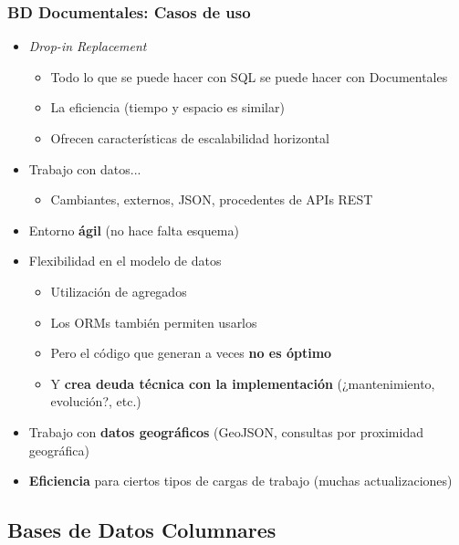 \documentclass[14pt]{beamer}
\begin{document}
\begin{frame}[allowframebreaks]
  \frametitle{BD Documentales: Casos de uso}
  \begin{itemize}
  \item {\em Drop-in Replacement\/}
    \begin{itemize}
    \item Todo lo que se puede hacer con SQL se puede hacer con
      Documentales
    \item La eficiencia (tiempo y espacio es similar)
    \item Ofrecen características de escalabilidad horizontal
    \end{itemize}
  \item Trabajo con datos...
    \begin{itemize}
    \item Cambiantes, externos, JSON, procedentes de APIs REST
    \end{itemize}
  \item Entorno {\bf ágil} (no hace falta esquema)

\framebreak

\item Flexibilidad en el modelo de datos
    \begin{itemize}
    \item Utilización de agregados
    \item Los ORMs también permiten usarlos
    \item Pero el código que generan a veces {\bf no es óptimo}
    \item Y {\bf crea deuda técnica con la implementación} (¿mantenimiento,
      evolución?, etc.)
    \end{itemize}
  \item Trabajo con {\bf datos geográficos} (GeoJSON, consultas por
    proximidad geográfica)
  \item {\bf Eficiencia} para ciertos tipos de cargas de trabajo (muchas
    actualizaciones)
  \end{itemize}
\end{frame}

\subsection{Bases de Datos Columnares}
\end{document}
